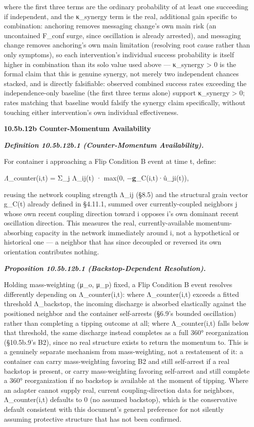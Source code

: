 \documentclass[
]{article}
\begin{document}
where the first three terms are the ordinary probability of at least one
succeeding if independent, and the κ\_synergy term is the real,
additional gain specific to combination: anchoring removes messaging
change's own main risk (an uncontained F\_conf surge, since oscillation
is already arrested), and messaging change removes anchoring's own main
limitation (resolving root cause rather than only symptoms), so each
intervention's individual success probability is itself higher in
combination than its solo value used above --- κ\_synergy \textgreater{}
0 is the formal claim that this is genuine synergy, not merely two
independent chances stacked, and is directly falsifiable: observed
combined success rates exceeding the independence-only baseline (the
first three terms alone) support κ\_synergy \textgreater{} 0; rates
matching that baseline would falsify the synergy claim specifically,
without touching either intervention's own individual effectiveness.

\textbf{10.5b.12b Counter-Momentum Availability}

\emph{\textbf{Definition 10.5b.12b.1 (Counter-Momentum Availability).}}

For container i approaching a Flip Condition B event at time t, define:

\emph{Λ}\_counter(i,t) = Σ\_j Λ\_ij(t) · max(0,
−\textbf{g}\_C(i,t)·û\_ji(t)),

reusing the network coupling strength Λ\_ij (§8.5) and the structural
grain vector g\_C(t) already defined in §4.11.1, summed over
currently-coupled neighbors j whose own recent coupling direction toward
i opposes i's own dominant recent oscillation direction. This measures
the real, currently-available momentum-absorbing capacity in the network
immediately around i, not a hypothetical or historical one --- a
neighbor that has since decoupled or reversed its own orientation
contributes nothing.

\emph{\textbf{Proposition 10.5b.12b.1 (Backstop-Dependent Resolution).}}

Holding mass-weighting (μ\_o, μ\_p) fixed, a Flip Condition B event
resolves differently depending on Λ\_counter(i,t): where Λ\_counter(i,t)
exceeds a fitted threshold Λ\_backstop, the incoming discharge is
absorbed elastically against the positioned neighbor and the container
self-arrests (§6.9's bounded oscillation) rather than completing a
tipping outcome at all; where Λ\_counter(i,t) falls below that
threshold, the same discharge instead completes as a full 360°
reorganization (§10.5b.9's B2), since no real structure exists to return
the momentum to. This is a genuinely separate mechanism from
mass-weighting, not a restatement of it: a container can carry
mass-weighting favoring B2 and still self-arrest if a real backstop is
present, or carry mass-weighting favoring self-arrest and still complete
a 360° reorganization if no backstop is available at the moment of
tipping. Where an adapter cannot supply real, current coupling-direction
data for neighbors, Λ\_counter(i,t) defaults to 0 (no assumed backstop),
which is the conservative default consistent with this document's
general preference for not silently assuming protective structure that
has not been confirmed.
\end{document}
